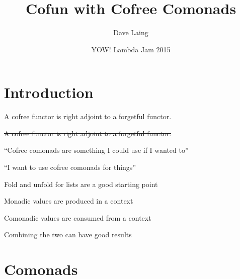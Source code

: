 \documentclass{beamer}
\title{Cofun with Cofree Comonads}
\author{Dave Laing}
\date{YOW! Lambda Jam 2015}
\begin{document}
\begin{frame}
\maketitle
\end{frame}

\section{Introduction}

\begin{frame}[c]
  \centering
  A cofree functor is right adjoint to a forgetful functor.
\end{frame}

\begin{frame}[c]
  \centering
  \sout{A cofree functor is right adjoint to a forgetful functor.}
\end{frame}

\begin{frame}[c]
  \centering
  ``Cofree comonads are something I could use if I wanted to''
\end{frame}

\begin{frame}[c]
  \centering
  ``I want to use cofree comonads for things''
\end{frame}

\begin{frame}[c]
  \centering
  Fold and unfold for lists are a good starting point
\end{frame}

\begin{frame}[c]
  \centering
  Monadic values are produced in a context
\end{frame}

\begin{frame}[c]
  \centering
  Comonadic values are consumed from a context
\end{frame}

\begin{frame}[c]
  \centering
  Combining the two can have good results
\end{frame}


\section{Comonads}
\end{document}
